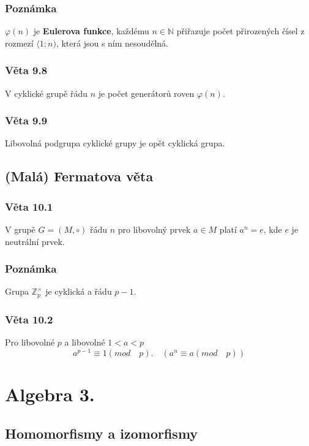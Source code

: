 \documentclass[12pt, letterpaper]{article}
\begin{document}
\subsubsection*{Poznámka}
$\varphi(n)$ je \textbf{Eulerova funkce},
 každému $n \in \mathbb{N}$ přiřazuje počet přirozených čísel z rozmezí $\langle 1;n)$, která jsou s ním nesoudělná.

\subsubsection*{Věta 9.8}
V cyklické grupě řádu $n$ je počet generátorů roven $\varphi(n)$.

\subsubsection*{Věta 9.9}
Libovolná podgrupa cyklické grupy je opět cyklická grupa.

\subsection{(Malá) Fermatova věta}

\subsubsection*{Věta 10.1}
V grupě $G = (M, \circ)$ řádu $n$ pro libovolný prvek $a \in M$ platí
$a^n = e$, kde $e$ je neutrální prvek. 

\subsubsection*{Poznámka}
Grupa $ \mathbb{Z}^{\times}_{p}$ je cyklická a řádu $p - 1$.

\subsubsection*{Věta 10.2}
Pro libovolné $p$ a libovolné $1 < a < p$
\[a^{p-1} \equiv 1 (mod \quad p). \quad (a^n \equiv a (mod \quad p))\] 

\section{Algebra 3.}

\subsection{Homomorfismy a izomorfismy}
\end{document}
